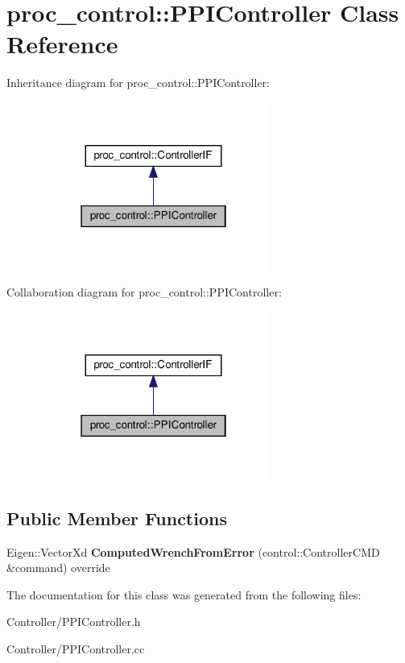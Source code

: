 \hypertarget{classproc__control_1_1_p_p_i_controller}{}\section{proc\+\_\+control\+:\+:P\+P\+I\+Controller Class Reference}
\label{classproc__control_1_1_p_p_i_controller}


Inheritance diagram for proc\+\_\+control\+:\+:P\+P\+I\+Controller\+:\nopagebreak
\begin{figure}[H]
\begin{center}
\leavevmode
\includegraphics[width=214pt]{classproc__control_1_1_p_p_i_controller__inherit__graph}
\end{center}
\end{figure}


Collaboration diagram for proc\+\_\+control\+:\+:P\+P\+I\+Controller\+:\nopagebreak
\begin{figure}[H]
\begin{center}
\leavevmode
\includegraphics[width=214pt]{classproc__control_1_1_p_p_i_controller__coll__graph}
\end{center}
\end{figure}
\subsection*{Public Member Functions}
\begin{DoxyCompactItemize}
\item 
\mbox{\label{classproc__control_1_1_p_p_i_controller_a9299c3beded1afa65de537e08b5ad841}} 
Eigen\+::\+Vector\+Xd {\bfseries Computed\+Wrench\+From\+Error} (control\+::\+Controller\+C\+MD \&command) override
\end{DoxyCompactItemize}


The documentation for this class was generated from the following files\+:\begin{DoxyCompactItemize}
\item 
Controller/P\+P\+I\+Controller.\+h\item 
Controller/P\+P\+I\+Controller.\+cc\end{DoxyCompactItemize}
